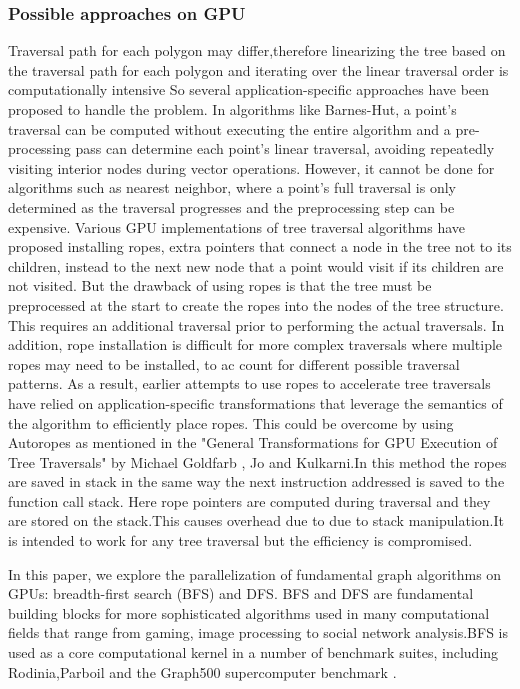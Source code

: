 \documentclass{article}
\begin{document}
\subsubsection{Possible approaches on GPU}

Traversal path for each polygon may differ,therefore linearizing the tree based on the traversal path for each polygon and iterating over the linear traversal order is computationally intensive
So several application-specific approaches have been proposed to handle the problem. 
 In algorithms like Barnes-Hut,  a point's traversal can be computed without executing the entire algorithm and a pre- processing pass can determine each point's linear traversal, avoiding repeatedly visiting interior nodes during vector operations. However, it cannot be done for algorithms such as nearest neighbor, where a point's full traversal is only determined as the traversal progresses and the preprocessing step can be expensive.
 Various GPU implementations of tree traversal algorithms have proposed installing ropes, extra pointers that connect a node in the tree not to its children,  instead to the next new node that a point would visit if its children are not visited. But the drawback of using ropes is that  the tree must be preprocessed at the start to create the ropes into the nodes of the tree structure.
  This requires an additional traversal prior to performing the actual traversals. In addition, rope installation is  difficult for more complex traversals where multiple ropes may need to be installed, to ac count for different possible traversal patterns. As a result, earlier attempts to use ropes to accelerate tree traversals have relied on application-specific transformations that leverage the semantics of the algorithm to efficiently place ropes.
This could be overcome by using Autoropes as mentioned in the "General Transformations for GPU Execution of Tree Traversals" by Michael Goldfarb , Jo and Kulkarni.In this method the ropes are saved in stack in the same way the next instruction addressed is saved to the function call stack.  Here rope pointers are computed during traversal and they are stored on the stack.This causes overhead due to due to stack manipulation.It is intended to work for any tree traversal but the efficiency is compromised.
 
In this paper, we explore the parallelization of  fundamental graph algorithms on GPUs: breadth-first search (BFS) and DFS.  BFS and DFS are fundamental building blocks for more sophisticated algorithms used in many computational fields that range from gaming, image processing to social network analysis.BFS is  used as a core computational kernel in a number of benchmark suites, including  Rodinia,Parboil and the Graph500 supercomputer benchmark .
\end{document}
